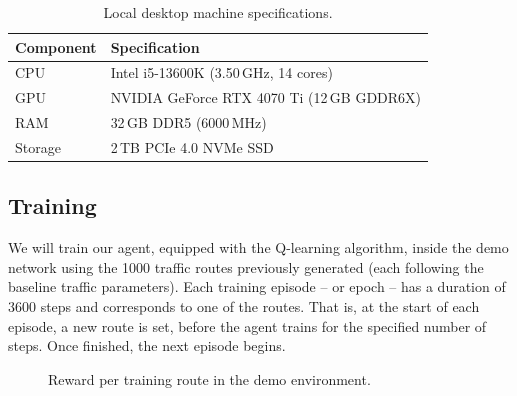 \documentclass[a4paper]{report}
\begin{document}
\begin{table}[H]
  \centering
  \begin{tabular}{l|l}
    \textbf{Component} & \textbf{Specification} \\
    \hline
    CPU & Intel i5-13600K (3.50\,GHz, 14 cores) \\
    GPU & NVIDIA GeForce RTX 4070 Ti (12\,GB GDDR6X) \\
    RAM & 32\,GB DDR5 (6000\,MHz) \\
    Storage & 2\,TB PCIe 4.0 NVMe SSD \\
  \end{tabular}
  \caption{Local desktop machine specifications.}
  \label{fig:machine_specifications}
\end{table}

\subsection{Training}

We will train our agent, equipped with the Q-learning algorithm, inside the demo network using the 1000 traffic routes previously generated (each following the baseline traffic parameters). Each training episode -- or epoch -- has a duration of 3600 steps and corresponds to one of the routes. That is, at the start of each episode, a new route is set, before the agent trains for the specified number of steps. Once finished, the next episode begins.

\begin{figure}[H]
  \centering
  \caption{Reward per training route in the demo environment.}
  \label{fig:q_learning_demo_train}
\end{figure}
\end{document}
